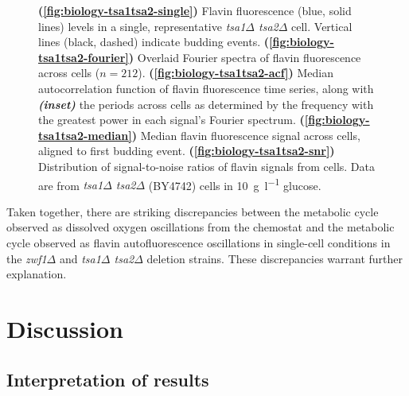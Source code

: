 \begin{figure}
  \caption[
    Flavin fluorescence levels in a single, representative \textit{tsa1$\Delta$ tsa2$\Delta$} cell.
    Overlaid Fourier spectra of flavin fluorescence across cells.
    Median autocorrelation function of flavin fluorescence time series, along with the periods across cells.
    Median flavin fluorescence signal across cells, aligned to first budding event.
    Distribution of signal-to-noise ratios of flavin signals from cells.
    Data are from \textit{tsa1$\Delta$ tsa2$\Delta$} (BY4742) cells in \SI{10}{\gram~\litre^{-1}} glucose.
  ]{
    \textbf{(\ref{fig:biology-tsa1tsa2-single})}
    Flavin fluorescence (blue, solid lines) levels in a single, representative \textit{tsa1$\Delta$ tsa2$\Delta$} cell.
    Vertical lines (black, dashed) indicate budding events.
    \textbf{(\ref{fig:biology-tsa1tsa2-fourier})}
    Overlaid Fourier spectra of flavin fluorescence across cells ($n=212$).
    \textbf{(\ref{fig:biology-tsa1tsa2-acf})}
    Median autocorrelation function of flavin fluorescence time series, along with \textit{\textbf{(inset)}} the periods across cells as determined by the frequency with the greatest power in each signal's Fourier spectrum.
    \textbf{(\ref{fig:biology-tsa1tsa2-median})}
    Median flavin fluorescence signal across cells, aligned to first budding event.
    \textbf{(\ref{fig:biology-tsa1tsa2-snr})}
    Distribution of signal-to-noise ratios of flavin signals from cells.
    Data are from \textit{tsa1$\Delta$ tsa2$\Delta$} (BY4742) cells in \SI{10}{\gram~\litre^{-1}} glucose.
  }
  \label{fig:biology-tsa1tsa2}
\end{figure}

Taken together, there are striking discrepancies between the metabolic cycle observed as dissolved oxygen oscillations from the chemostat and the metabolic cycle observed as flavin autofluorescence oscillations in single-cell conditions in the \textit{zwf1$\Delta$} and \textit{tsa1$\Delta$ tsa2$\Delta$} deletion strains.
These discrepancies warrant further explanation.


\section{Discussion}
\label{sec:biology-discussion}

\subsection{Interpretation of results}
\label{subsec:biology-discussion-interpretation}


